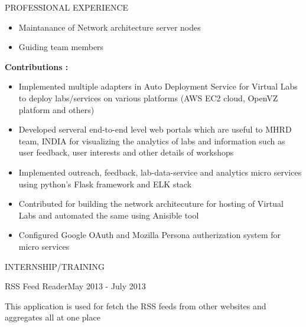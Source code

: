 \documentclass{resume} %
\begin{document}
\begin{rSection}{PROFESSIONAL EXPERIENCE}
\begin{rSubsection}
\begin{itemize}
    \item Maintanance of Network architecture server nodes

    \item Guiding team members
    \end{itemize}

    \hfill

    \textbf{Contributions : }
    \begin{itemize}

    \item Implemented multiple adapters in Auto Deployment
      Service for Virtual Labs to deploy labs/services on
      various platforms (AWS EC2 cloud, OpenVZ platform and
      others)
      
    \item Developed serveral end-to-end level web portals
      which are useful to MHRD team, INDIA for visualizing
      the analytics of labs and information such as user
      feedback, user interests and other details of
      workshops
      
    \item Implemented outreach, feedback, lab-data-service
      and analytics micro services using python's Flask
      framework and ELK stack
      
    \item Contributed for building the network architecuture
      for hosting of Virtual Labs and automated the same
      using Anisible tool

    \item Configured Google OAuth and Mozilla Persona
      autherization system for micro services
      
    \end{itemize}
  \end{rSubsection}

\end{rSection}



\begin{rSection}{INTERNSHIP/TRAINING}

  \begin{rSubsection}
    {RSS Feed Reader}{May 2013 - July 2013}{}{}
  \item This application is used for fetch the RSS feeds
    from other websites and aggregates all at one place
 
  \end{rSubsection} 

\end{rSection} 
\end{document}
